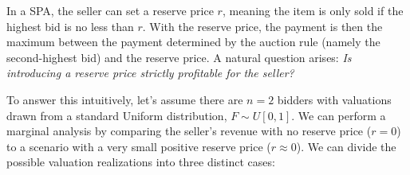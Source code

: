 In a SPA, the seller can set a reserve price $r$, meaning the item is only sold if the highest bid is no less than $r$. With the reserve price,  the payment is then the maximum between the payment determined by the auction rule (namely the second-highest bid) and the reserve price. A natural question arises: \textit{Is introducing a reserve price strictly profitable for the seller?}

To answer this intuitively, let's assume there are $n=2$ bidders with valuations drawn from a standard Uniform distribution, $F \sim U[0,1]$. We can perform a marginal analysis by comparing the seller's revenue with no reserve price ($r=0$) to a scenario with a very small positive reserve price ($r \approx 0$). We can divide the possible valuation realizations into three distinct cases:

\begin{center}
\end{center}

